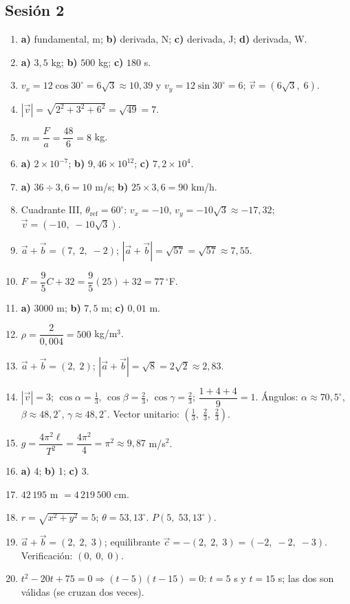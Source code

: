 \documentclass[12pt, letterpaper]{article}
\providecommand{\sen}{\sin}
\begin{document}
\subsection*{Sesión 2}
\begin{enumerate}[leftmargin=*, label=\textbf{\arabic*.}]
  \item \textbf{a)} fundamental, m; \textbf{b)} derivada, N; \textbf{c)} derivada, J; \textbf{d)} derivada, W.
  \item \textbf{a)} $3{,}5$ kg; \textbf{b)} $500$ kg; \textbf{c)} $180$ s.
  \item $v_x=12\cos 30^{\circ}=6\sqrt{3}\approx 10{,}39$ y $v_y=12\sen 30^{\circ}=6$; $\vec v=(6\sqrt{3},\; 6)$.
  \item $|\vec v|=\sqrt{2^2+3^2+6^2}=\sqrt{49}=7$.
  \item $m=\dfrac{F}{a}=\dfrac{48}{6}=8$ kg.
  \item \textbf{a)} $2 \times 10^{-7}$; \textbf{b)} $9{,}46 \times 10^{12}$; \textbf{c)} $7{,}2 \times 10^{4}$.
  \item \textbf{a)} $36 \div 3{,}6 = 10$ m/s; \quad \textbf{b)} $25 \times 3{,}6 = 90$ km/h.
  \item Cuadrante III, $\theta_{\text{ref}}=60^{\circ}$: $v_x=-10$, $v_y=-10\sqrt{3}\approx -17{,}32$; $\vec v=(-10,\; -10\sqrt{3})$.
  \item $\vec a+\vec b=(7,\; 2,\; -2)$; $|\vec a+\vec b|=\sqrt{57}=\sqrt{57}\approx 7{,}55$.
  \item $F=\dfrac{9}{5}C+32=\dfrac{9}{5}(25)+32=77\,^{\circ}$F.
  \item \textbf{a)} $3000$ m; \textbf{b)} $7{,}5$ m; \textbf{c)} $0{,}01$ m.
  \item $\rho=\dfrac{2}{0{,}004}=500$ kg/m$^3$.
  \item $\vec a+\vec b=(2,\; 2)$; $|\vec a+\vec b|=\sqrt{8}=2\sqrt{2}\approx 2{,}83$.
  \item $|\vec v|=3$; $\cos\alpha=\frac{1}{3}$, $\cos\beta=\frac{2}{3}$, $\cos\gamma=\frac{2}{3}$; $\dfrac{1+4+4}{9}=1$. \checkmark\quad Ángulos: $\alpha\approx 70{,}5^{\circ}$, $\beta\approx 48{,}2^{\circ}$, $\gamma\approx 48{,}2^{\circ}$. Vector unitario: $(\frac{1}{3},\; \frac{2}{3},\; \frac{2}{3})$.
  \item $g=\dfrac{4\pi^2\ell}{T^2}=\dfrac{4\pi^2}{4}=\pi^2\approx 9{,}87$ m/s$^2$.
  \item \textbf{a)} 4; \quad \textbf{b)} 1; \quad \textbf{c)} 3.
  \item $42\,195$ m $=4\,219\,500$ cm.
  \item $r=\sqrt{x^2+y^2}=5$; $\theta=53{,}13^{\circ}$. $P(5,\; 53{,}13^{\circ})$.
  \item $\vec a+\vec b=(2,\; 2,\; 3)$; equilibrante $\vec c=-(2,\; 2,\; 3)=(-2,\; -2,\; -3)$. Verificación: $(0,\; 0,\; 0)$. \checkmark
  \item $t^2-20t+75=0\Rightarrow(t-5)(t-15)=0$: $t=5$ s y $t=15$ s; las dos son válidas (se cruzan dos veces).
\end{enumerate}
\end{document}
